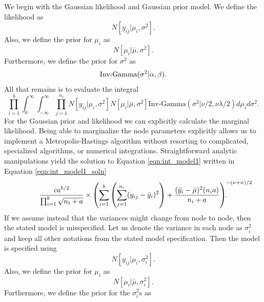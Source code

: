 We begin with the Gaussian likelihood and Gaussian prior model. We define the likelihood as 
\begin{equation}\label{eqn:norm_lhood1}
N[y_{ij} \vert \mu_i, \sigma^2].
\end{equation}
Also, we define the prior for $\mu_i$ as 
\begin{equation}\label{eqn:norm_prior1}
N[\mu_i\vert \bar{\mu}, \sigma^2 ].
\end{equation}
Furthermore, we define the prior for $\sigma^2$ as 
\begin{equation}\newnot{symbol:inv_gamma}
\text{Inv-Gamma}(\sigma^2\vert \alpha, \beta).
\end{equation}
All that remains is to evaluate the integral 
\begin{equation}\label{eqn:int_model1}
\prod_{i=1}^b \int_0^\infty \int_{-\infty}^{\infty} \prod_{j=1}^{n_i} N[y_{ij} \vert \mu_i, \sigma^2]N[\mu_i\vert \bar{\mu}, \sigma^2 ]\text{Inv-Gamma}(\sigma^2\vert \nu/2, \nu\lambda/2)d\mu_id\sigma^2.
\end{equation}
For the Gaussian prior and likelihood we can explicitly calculate the marginal likelihood. Being able to marginalize the node parameters explicitly allows us to implement a Metropolis-Hastings algorithm without resorting to complicated, specialized algorithms, or numerical integrations. Straightforward analytic manipulations yield the solution to Equation \ref{eqn:int_model1} written in Equation \ref{eqn:int_model1_soln}
\begin{equation}\label{eqn:int_model1_soln}
\frac{ca^{b/2}}{\prod_{i=1}^b\sqrt{n_i+a}}\times \left(\sum_{i=1}^b\left(\sum_{j=1}^{n_{i}}(y_{ij}-\bar{y}_i)^2\right)+ \frac{(\bar{y}_i -\bar{\mu})^2(n_ia)}{n_i+a} \right)^{-(\nu+n)/2}\hspace{-1.4cm}.
\end{equation}
If we assume instead that the variances might change from node to node, then the stated model is misspecified. Let us denote the variance in each node as $\sigma_i^2$ and keep all other notations from the stated model specification. Then the model is specified using 
\begin{equation}\label{eqn:normal_likelihood_many_variance}
N[y_{ij} \vert \mu_i, \sigma_i^2].
\end{equation}
Also, we define the prior for $\mu_i$ as 
\begin{equation}\label{eqn:multi_variance_prior}
N[\mu_i\vert \bar{\mu}, \sigma_i^2 ].
\end{equation}
Furthermore, we define the prior for the $\sigma_i^2$s as 

